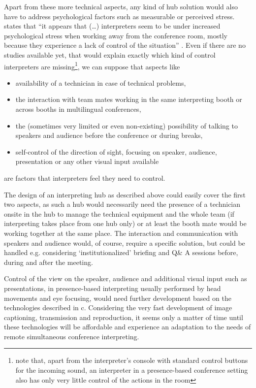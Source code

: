 \documentclass[output=paper]{langsci/langscibook}
\begin{document}
Apart from these more technical aspects, any kind of hub solution would also have to address psychological factors such as measurable or perceived stress. \citet{Moser-Mercer2005} states that “it appears that (…) interpreters seem to be under increased psychological stress when working away from the conference room, mostly because they experience a lack of control of the situation” \citep[15]{Moser-Mercer2005}. Even if there are no studies available yet, that would explain exactly which kind of control interpreters are missing\footnote{note that, apart from the interpreter’s console with standard control buttons for the incoming sound, an interpreter in a presence-based conference setting also has only very little control of the actions in the room}, we can suppose that aspects like

\begin{itemize}
\item availability of a technician in case of technical problems,
\item the interaction with team mates working in the same interpreting booth or across booths in multilingual conferences,
\item the (sometimes very limited or even non-existing) possibility of talking to speakers and audience before the conference or during breaks,
\item self-control of the direction of sight, focusing on speaker, audience, presentation or any other visual input available
\end{itemize}

are factors that interpreters feel they need to control.

The design of an interpreting hub as described above could easily cover the first two aspects, as such a hub would necessarily need the presence of a technician onsite in the hub to manage the technical equipment and the whole team (if interpreting takes place from one hub only) or at least the booth mate would be working together at the same place. 
The interaction and communication with speakers and audience would, of course, require a specific solution, but could be handled e.g. considering ‘institutionalized’ briefing and Q\& A sessions before, during and after the meeting.

Control of the view on the speaker, audience and additional visual input such as presentations, in presence-based interpreting usually performed by head movements and eye focusing, would need further development based on the technologies described in c. Considering the very fast development of image captioning, transmission and reproduction, it seems only a matter of time until these technologies will be affordable and experience an adaptation to the needs of remote simultaneous conference interpreting. 
\end{document}
